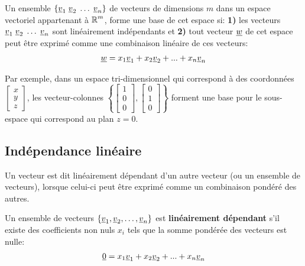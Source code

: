 Un ensemble $\{ \underline{v}_1 \; \underline{v}_2 \; \hdots \; \underline{v}_n \}$ de vecteurs de dimensions $m$ dans un espace vectoriel appartenant à $\operatorname{\mathbb{R}}^m$, forme une base de cet espace si: \textbf{1)} les vecteurs $\underline{v}_1 \; \underline{v}_2 \; \hdots \; \underline{v}_n$ sont linéairement indépendants et \textbf{2)} tout vecteur $\underline{w}$ de cet espace peut être exprimé comme une combinaison linéaire de ces vecteurs:
\begin{align}
\underline{w} = x_1 \underline{v}_1 + x_2 \underline{v}_2 + ... + x_n \underline{v}_n
\end{align}

Par exemple, dans un espace tri-dimensionnel qui correspond à des coordonnées $
\left[
\begin{array}{c}
x \\ y \\ z
\end{array}
\right]
$, les vecteur-colonnes $\left\{ 
\left[
\begin{array}{c}
1 \\ 0 \\ 0
\end{array}
\right],
\left[
\begin{array}{c}
0 \\ 1 \\ 0
\end{array}
\right]
\right\}$
forment une base pour le sous-espace qui correspond au plan $z=0$.

\subsection{Indépendance linéaire}
\label{sec:lindep}

Un vecteur est dit linéairement dépendant d'un autre vecteur (ou un ensemble de vecteurs), lorsque celui-ci peut être exprimé comme un combinaison pondéré des autres. 


Un ensemble de vecteurs $\left\{ \underline{v}_1, \underline{v}_2, \hdots, \underline{v}_n \right\}$ est \textbf{linéairement dépendant} s'il existe des coefficients non nuls $x_i$ tels que la somme pondérée des vecteurs est nulle:
\begin{align}
\underline{0} = x_1 \underline{v}_1 + x_2 \underline{v}_2 + ... + x_n \underline{v}_n
\end{align}

